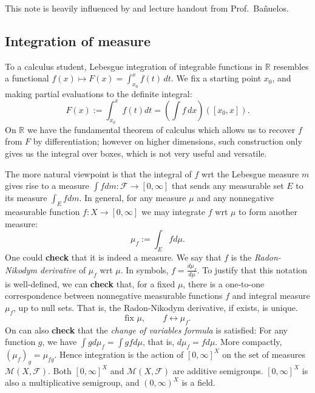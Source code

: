 
This note is heavily influenced by \cite{taoEpsilonRoomReal2010} and lecture handout from Prof.~Ba\~nuelos.


\subsection{Integration of measure}

To a calculus student, Lebesgue integration of integrable functions in $\mathbb{R}$ resembles a functional $f(x) \mapsto F(x) = \int_{x_0}^x f(t) \,dt$. We fix a starting point $x_0$, and making partial evaluations to the definite integral:
 \[
	F(x) := \int_{x_0}^x f(t) dt = \left( \int f \, dx \right)  ([x_0,x])
.\] 
On $\mathbb{R}$ we have the fundamental theorem of calculus which allows us to recover $f$ from $F$ by differentiation; however on higher dimensions, such construction only gives us the integral over boxes, which is not very useful and versatile.

The more natural viewpoint is that the integral of $f$ wrt the Lebesgue measure $m$ gives rise to a measure $\int f dm : \mathcal{F} \to [0,\infty ]$ that sends any measurable set $E$ to its measure $\int_E f dm$. 
In general, for any measure $\mu$ and any nonnegative measurable function $f: X \to [0,\infty ]$ we may integrate $f$ wrt $\mu$ to form another measure:
\[
	\mu_f := \int _E f d\mu
.\] 
One could \textbf{check} that it is indeed a measure. We say that $f$ is the \textit{Radon-Nikodym derivative} of $\mu_f$ wrt $\mu$. In symbols, $f = \frac{d \mu_f}{d \mu}$. To justify that this notation is well-defined, we can \textbf{check} that, for a fixed $\mu$, there is a one-to-one correspondence between nonnegative measurable functions $f$ and integral measure $\mu_f$, up to null sets. That is, the Radon-Nikodym derivative, if exists, is unique.
\[
	\text{fix }\mu, \qquad f \leftrightarrow \mu_f
.\] 
On can also \textbf{check} that the \textit{change of variables formula} is satisfied: For any function $g$, we have $\int g d\mu_f = \int g f d\mu$, that is, $d\mu_f = f d\mu $. More compactly, $(\mu_f)_g = \mu_{fg}$. Hence integration is the action of $[0, \infty ]^X$ on the set of measures $\mathcal{M}(X, \mathcal{F})$. Both $[0,\infty ]^X$ and $\mathcal{M}(X, \mathcal{F})$ are additive semigroups. $[0,\infty ]^X$ is also a multiplicative semigroup, and $(0,\infty )^X$ is a field.

